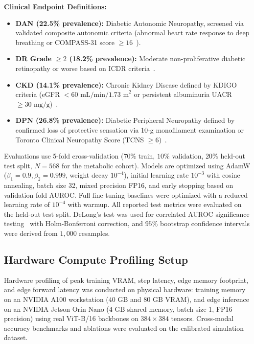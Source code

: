 \documentclass[a4paper,fleqn]{cas-dc}
\begin{document}
\noindent\textbf{Clinical Endpoint Definitions:}
\begin{itemize}
    \item \textbf{DAN (22.5\% prevalence):} Diabetic Autonomic Neuropathy, screened via validated composite autonomic criteria (abnormal heart rate response to deep breathing or COMPASS-31 score $\ge 16$~\cite{sletten2012compass}).
    \item \textbf{DR Grade $\ge 2$ (18.2\% prevalence):} Moderate non-proliferative diabetic retinopathy or worse based on ICDR criteria~\cite{gulshan2016development}.
    \item \textbf{CKD (14.1\% prevalence):} Chronic Kidney Disease defined by KDIGO criteria (eGFR $< 60\text{ mL/min/1.73 m}^2$ or persistent albuminuria UACR $\ge 30\text{ mg/g}$)~\cite{kdigo2013ckd}.
    \item \textbf{DPN (26.8\% prevalence):} Diabetic Peripheral Neuropathy defined by confirmed loss of protective sensation via 10-g monofilament examination or Toronto Clinical Neuropathy Score (TCNS $\ge 6$)~\cite{bril2002toronto}.
\end{itemize}

Evaluations use 5-fold cross-validation ($70\%$ train, $10\%$ validation, $20\%$ held-out test split, $N=568$ for the metabolic cohort). Models are optimized using AdamW ($\beta_1=0.9, \beta_2=0.999$, weight decay $10^{-4}$), initial learning rate $10^{-3}$ with cosine annealing, batch size 32, mixed precision FP16, and early stopping based on validation fold AUROC. Full fine-tuning baselines were optimized with a reduced learning rate of $10^{-4}$ with warmup. All reported test metrics were evaluated on the held-out test split. DeLong's test was used for correlated AUROC significance testing~\cite{delong1988comparing} with Holm-Bonferroni correction, and $95\%$ bootstrap confidence intervals were derived from $1{,}000$ resamples.

\subsection{Hardware Compute Profiling Setup}
\label{sec:hardware_setup}
Hardware profiling of peak training VRAM, step latency, edge memory footprint, and edge forward latency was conducted on physical hardware: training memory on an NVIDIA A100 workstation ($40\text{ GB}$ and $80\text{ GB}$ VRAM), and edge inference on an NVIDIA Jetson Orin Nano ($4\text{ GB}$ shared memory, batch size 1, FP16 precision) using real ViT-B/16 backbones on $384 \times 384$ tensors. Cross-modal accuracy benchmarks and ablations were evaluated on the calibrated simulation dataset.
\end{document}
